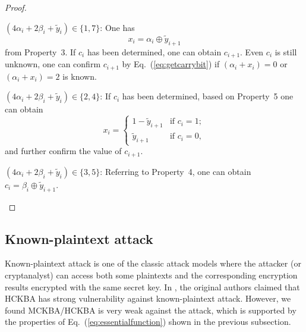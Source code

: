 \documentclass{ws-ijbc}
\begin{document}
\begin{proof}
\begin{itemlist}
\begin{itemlist}
\item $(4\alpha_i+2\beta_i+\tilde{y}_i)\in\{1, 7\}$: One has
\begin{equation}
x_i=\alpha_i\oplus \tilde{y}_{i+1}
\label{eq:xi17}
\end{equation}
from Property~3. If $c_i$ has been determined, one can obtain
$c_{i+1}$. Even $c_i$ is still unknown, one can confirm $c_{i+1}$ by Eq.~(\ref{eq:getcarrybit}) if $(\alpha_i+x_i)=0$ or $(\alpha_i+x_i)=2$ is known.

\item $(4\alpha_i+2\beta_i+\tilde{y}_i)\in\{2, 4\}$: If $c_i$ has been determined, based on Property~5 one can obtain
\begin{equation}
x_i=
\begin{cases}
1-\tilde{y}_{i+1} & \mbox{if }  c_i=1;\\
\tilde{y}_{i+1}  & \mbox{if }  c_i=0,
\end{cases}
\label{eq:xi24}
\end{equation}
and further confirm the value of $c_{i+1}$.

\item $(4\alpha_i+2\beta_i+\tilde{y}_i)\in\{3, 5\}$: Referring to Property~4, one can obtain $c_i=\beta_i\oplus \tilde{y}_{i+1}$.
\end{itemlist}
\end{itemlist}
\end{proof}

\subsection{Known-plaintext attack}

Known-plaintext attack is one of the classic attack models where the attacker (or cryptanalyst) can
access both some plaintexts and the corresponding encryption results encrypted with the same secret key.
In \cite[Sec.~3.2]{CH:HCKBA:IJBC10}, the original authors claimed that HCKBA has strong vulnerability against known-plaintext attack.
However, we found MCKBA/HCKBA is very weak against the attack, which is supported by the properties of Eq.~(\ref{eq:essentialfunction}) shown
in the previous subsection.
\end{document}
